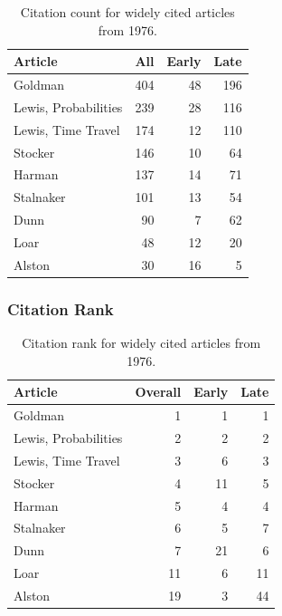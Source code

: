 \documentclass[
  10pt,
  letterpaper,
  DIV=11,
  numbers=noendperiod,
  twoside]{scrartcl}
\begin{document}
\begin{longtable}[]{@{}lrrr@{}}

\caption{\label{tbl-citation-count-1976}Citation count for widely cited
articles from 1976.}

\tabularnewline

\toprule\noalign{}
Article & All & Early & Late \\
\midrule\noalign{}
\endhead
\bottomrule\noalign{}
\endlastfoot
Goldman & 404 & 48 & 196 \\
Lewis, Probabilities & 239 & 28 & 116 \\
Lewis, Time Travel & 174 & 12 & 110 \\
Stocker & 146 & 10 & 64 \\
Harman & 137 & 14 & 71 \\
Stalnaker & 101 & 13 & 54 \\
Dunn & 90 & 7 & 62 \\
Loar & 48 & 12 & 20 \\
Alston & 30 & 16 & 5 \\

\end{longtable}

\subsubsection*{Citation Rank}\label{sec-rank-1976}

\begin{longtable}[]{@{}lrrr@{}}

\caption{\label{tbl-citation-rank-1976}Citation rank for widely cited
articles from 1976.}

\tabularnewline

\toprule\noalign{}
Article & Overall & Early & Late \\
\midrule\noalign{}
\endhead
\bottomrule\noalign{}
\endlastfoot
Goldman & 1 & 1 & 1 \\
Lewis, Probabilities & 2 & 2 & 2 \\
Lewis, Time Travel & 3 & 6 & 3 \\
Stocker & 4 & 11 & 5 \\
Harman & 5 & 4 & 4 \\
Stalnaker & 6 & 5 & 7 \\
Dunn & 7 & 21 & 6 \\
Loar & 11 & 6 & 11 \\
Alston & 19 & 3 & 44 \\

\end{longtable}
\end{document}

